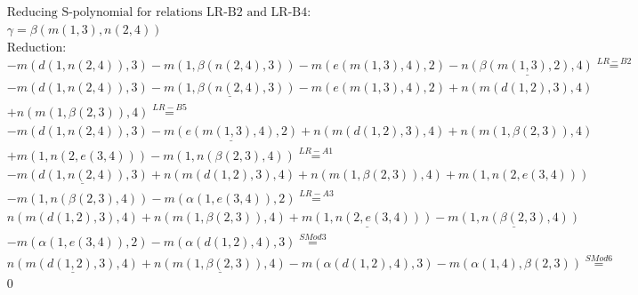 \documentclass[11pt]{amsart}
\begin{document}
\begin{align*} 
& \text{Reducing S-polynomial for relations LR-B2 and LR-B4:} \\ 
& \gamma = \beta(m(1,3),n(2,4)) \\ 
& \text{Reduction}: \\& - m(d(1,n(2,4)),3) - m(1,\beta(n(2,4),3)) - m(e(m(1,3),4),2) - \underline{n(\beta(m(1,3),2),4)} \stackrel{ LR-B2 }{=}  \\ 
& - m(d(1,n(2,4)),3) - \underline{m(1,\beta(n(2,4),3))} - m(e(m(1,3),4),2) + n(m(d(1,2),3),4)\\ 
 &  + n(m(1,\beta(2,3)),4) \stackrel{ LR-B5 }{=}  \\ 
& - m(d(1,n(2,4)),3) - \underline{m(e(m(1,3),4),2)} + n(m(d(1,2),3),4) + n(m(1,\beta(2,3)),4)\\ 
 &  + m(1,n(2,e(3,4))) - m(1,n(\beta(2,3),4)) \stackrel{ LR-A1 }{=}  \\ 
& - \underline{m(d(1,n(2,4)),3)} + n(m(d(1,2),3),4) + n(m(1,\beta(2,3)),4) + m(1,n(2,e(3,4)))\\ 
 &  - m(1,n(\beta(2,3),4)) - m(\alpha(1,e(3,4)),2) \stackrel{ LR-A3 }{=}  \\ 
&n(m(d(1,2),3),4) + n(m(1,\beta(2,3)),4) + \underline{m(1,n(2,e(3,4)))} - \underline{m(1,n(\beta(2,3),4))}\\ 
 &  - m(\alpha(1,e(3,4)),2) - m(\alpha(d(1,2),4),3) \stackrel{ SMod3 }{=}  \\ 
&\underline{n(m(d(1,2),3),4)} + \underline{n(m(1,\beta(2,3)),4)} - m(\alpha(d(1,2),4),3) - m(\alpha(1,4),\beta(2,3)) \stackrel{ SMod6 }{=}  \\ 
&0\\ 
\end{align*} 
 
\end{document}
